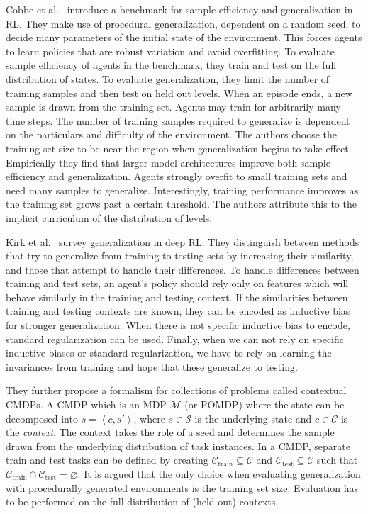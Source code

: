 Cobbe et al.~\cite{cobbe_leveraging_2020} introduce a benchmark for sample efficiency and generalization in RL.
They make use of procedural generalization, dependent on a random seed, to decide many parameters of the initial state of the environment.
This forces agents to learn policies that are robust variation and avoid overfitting.
To evaluate sample efficiency of agents in the benchmark, they train and test on the full distribution of states.
To evaluate generalization, they limit the number of training samples and then test on held out levels.
When an episode ends, a new sample is drawn from the training set.
Agents may train for arbitrarily many time steps.
The number of training samples required to generalize is dependent on the particulars and difficulty of the environment.
The authors choose the training set size to be near the region when generalization begins to take effect.
Empirically they find that larger model architectures improve both sample efficiency and generalization.
Agents strongly overfit to small training sets and need many samples to generalize.
Interestingly, training performance improves as the training set grows past a certain threshold.
The authors attribute this to the implicit curriculum of the distribution of levels.

Kirk et al.~\cite{kirk_survey_2022} survey generalization in deep RL.
They distinguish between methods that try to generalize from training to testing sets by increasing their similarity, and those that attempt to handle their differences.
To handle differences between training and test sets, an agent's policy should rely only on features which will behave similarly in the training and testing context.
If the similarities between training and testing contexts are known, they can be encoded as inductive bias for stronger generalization.
When there is not specific inductive bias to encode, standard regularization can be used.
Finally, when we can not rely on specific inductive biases or standard regularization, we have to rely on learning the invariances from training and hope that these generalize to testing.

They further propose a formalism for collections of problems called contextual CMDPs.
A CMDP which is an MDP \(\mathcal{M}\) (or POMDP) where the state can be decomposed into \(s = \left\langle c, s' \right\rangle\),
where \(s \in \mathcal{S}\) is the underlying state and \(c \in \mathcal{C}\) is the \textit{context}.
The context takes the role of a seed and determines the sample drawn from the underlying distribution of task instances.
In a CMDP, separate train and test tasks can be defined by creating \(\mathcal{C}_\text{train} \subseteq \mathcal{C}\) and \(\mathcal{C}_\text{test} \subseteq \mathcal{C}\) such that \(\mathcal{C}_\text{train} \cap \mathcal{C}_\text{test} = \varnothing\).
It is argued that the only choice when evaluating generalization with procedurally generated environments is the training set size.
Evaluation has to be performed on the full distribution of (held out) contexts.

